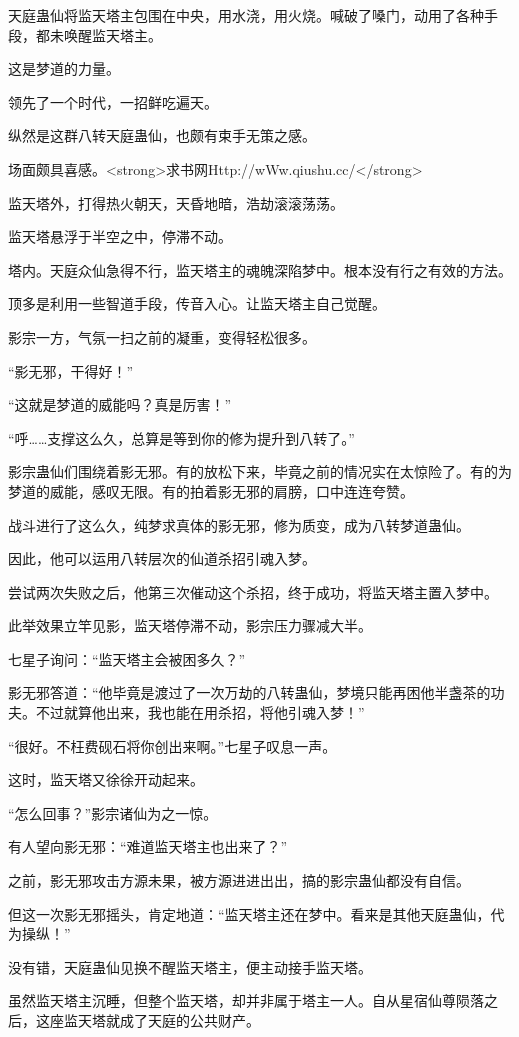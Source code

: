 \begin{this_body}
天庭蛊仙将监天塔主包围在中央，用水浇，用火烧。喊破了嗓门，动用了各种手段，都未唤醒监天塔主。

这是梦道的力量。

领先了一个时代，一招鲜吃遍天。

纵然是这群八转天庭蛊仙，也颇有束手无策之感。

场面颇具喜感。<strong>求书网Http://wWw.qiushu.cc/</strong>

监天塔外，打得热火朝天，天昏地暗，浩劫滚滚荡荡。

监天塔悬浮于半空之中，停滞不动。

塔内。天庭众仙急得不行，监天塔主的魂魄深陷梦中。根本没有行之有效的方法。

顶多是利用一些智道手段，传音入心。让监天塔主自己觉醒。

影宗一方，气氛一扫之前的凝重，变得轻松很多。

“影无邪，干得好！”

“这就是梦道的威能吗？真是厉害！”

“呼……支撑这么久，总算是等到你的修为提升到八转了。”

影宗蛊仙们围绕着影无邪。有的放松下来，毕竟之前的情况实在太惊险了。有的为梦道的威能，感叹无限。有的拍着影无邪的肩膀，口中连连夸赞。

战斗进行了这么久，纯梦求真体的影无邪，修为质变，成为八转梦道蛊仙。

因此，他可以运用八转层次的仙道杀招引魂入梦。

尝试两次失败之后，他第三次催动这个杀招，终于成功，将监天塔主置入梦中。

此举效果立竿见影，监天塔停滞不动，影宗压力骤减大半。

七星子询问：“监天塔主会被困多久？”

影无邪答道：“他毕竟是渡过了一次万劫的八转蛊仙，梦境只能再困他半盏茶的功夫。不过就算他出来，我也能在用杀招，将他引魂入梦！”

“很好。不枉费砚石将你创出来啊。”七星子叹息一声。

这时，监天塔又徐徐开动起来。

“怎么回事？”影宗诸仙为之一惊。

有人望向影无邪：“难道监天塔主也出来了？”

之前，影无邪攻击方源未果，被方源进进出出，搞的影宗蛊仙都没有自信。

但这一次影无邪摇头，肯定地道：“监天塔主还在梦中。看来是其他天庭蛊仙，代为操纵！”

没有错，天庭蛊仙见换不醒监天塔主，便主动接手监天塔。

虽然监天塔主沉睡，但整个监天塔，却并非属于塔主一人。自从星宿仙尊陨落之后，这座监天塔就成了天庭的公共财产。


\end{this_body}
